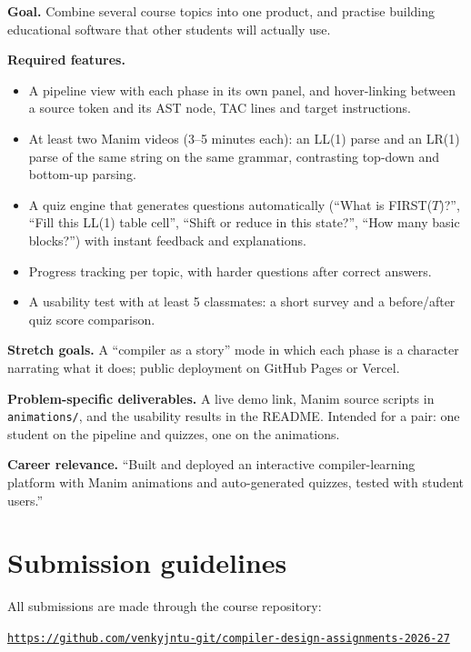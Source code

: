 \documentclass[11pt,a4paper]{article}
\newcommand{\courserepo}{https://github.com/venkyjntu-git/compiler-design-assignments-2026-27}
\newcommand{\fld}[1]{\par\smallskip\textbf{\color{accent}#1}\quad}
\begin{document}
\fld{Goal.} Combine several course topics into one product, and practise building educational
software that other students will actually use.

\fld{Required features.}
\begin{itemize}
  \item A pipeline view with each phase in its own panel, and hover-linking between a source token and its AST node, TAC lines and target instructions.
  \item At least two Manim videos (3--5 minutes each): an LL(1) parse and an LR(1) parse of the same string on the same grammar, contrasting top-down and bottom-up parsing.
  \item A quiz engine that generates questions automatically (``What is FIRST($T$)?'', ``Fill this LL(1) table cell'', ``Shift or reduce in this state?'', ``How many basic blocks?'') with instant feedback and explanations.
  \item Progress tracking per topic, with harder questions after correct answers.
  \item A usability test with at least 5 classmates: a short survey and a before/after quiz score comparison.
\end{itemize}

\fld{Stretch goals.} A ``compiler as a story'' mode in which each phase is a character narrating
what it does; public deployment on GitHub Pages or Vercel.

\fld{Problem-specific deliverables.} A live demo link, Manim source scripts in \texttt{animations/},
and the usability results in the README. Intended for a pair: one student on the pipeline and
quizzes, one on the animations.

\fld{Career relevance.} ``Built and deployed an interactive compiler-learning platform with Manim animations and auto-generated quizzes, tested with student users.''

\section{Submission guidelines}\label{sec:submission}

All submissions are made through the course repository:
\begin{center}
\href{\courserepo}{\texttt{\courserepo}}
\end{center}
\end{document}
